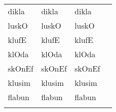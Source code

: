 \begin{appendix}
\begin{longtable}[t]{>{\raggedright\arraybackslash}p{10em}>{\raggedright\arraybackslash}p{10em}>{\raggedright\arraybackslash}p{10em}>{\raggedright\arraybackslash}p{10em}}
\hspace{1em}\hspace{1em}dikla & dikla & dikla & \\
\hspace{1em}\hspace{1em}luskO & luskO & luskO & \\
\hspace{1em}\hspace{1em}klufE & klufE & klufE & \\
\hspace{1em}\hspace{1em}klOda & klOda & klOda & \\
\hspace{1em}\hspace{1em}skOnEf & skOnEf & skOnEf & \\
\hspace{1em}\hspace{1em}klusim & klusim & klusim & \\
\hspace{1em}\hspace{1em}flabun & flabun & flabun & \\*
\end{longtable}
\endgroup{}
\end{appendix}
